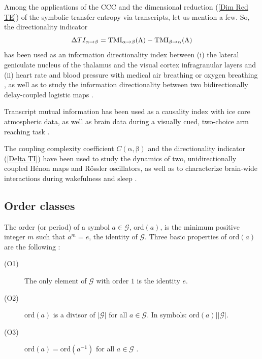 \documentclass[%
 aip,
 amsmath,amssymb,
 reprint,%
]{revtex4-1}
\begin{document}
Among the applications of the CCC and the dimensional reduction (\ref{Dim
Red TE}) of the symbolic transfer entropy via transcripts, let us mention a
few. So, the directionality indicator%
\begin{equation}
\Delta TI_{\mathrm{\alpha }\rightarrow \mathrm{\beta }}=\mathrm{TMI}_{%
\mathrm{\alpha }\rightarrow \mathrm{\beta }}(\Lambda )-\mathrm{TMI}_{\mathrm{%
\beta }\rightarrow \mathrm{\alpha }}(\Lambda )  \label{Delta TI}
\end{equation}%
has been used as an information directionality index between (i) the lateral
geniculate nucleus of the thalamus and the visual cortex infragranular
layers \cite{Amigo2015} and (ii) heart rate and blood pressure with medical
air breathing or oxygen breathing \cite{Amigo2016}, as well as to study the
information directionality between two bidirectionally delay-coupled
logistic maps \cite{Amigo2016}.

Transcript mutual information has been used as a causality index with ice core
atmospheric data, as well as brain data during a visually cued, two-choice
arm reaching task \cite{Hirata2016}.

The coupling complexity coefficient $C(\mathrm{\alpha },\mathrm{\beta })$
and the directionality indicator (\ref{Delta TI}) have been used to study
the dynamics of two, unidirectionally coupled H\'{e}non maps and R\"{o}ssler
oscillators, as well as to characterize brain-wide interactions during
wakefulness and sleep \cite{Adams2025B}.


\subsection{Order classes}

\label{sec53}

The order (or period) of a symbol $a\in \mathcal{G}$, \textrm{ord}$(a)$, is
the minimum positive integer $m$ such that $a^{m}=e$, the identity of $%
\mathcal{G}$. Three basic properties of \textrm{ord}$(a)$ are the following 
\cite{Herstein1996}:

\begin{description}
\item[(O1)] The only element of $\mathcal{G}$ with order $1$ is the identity 
$e$.

\item[(O2)] \textrm{ord}$(a)$ is a divisor of $\left\vert \mathcal{G}%
\right\vert $ for all $a\in \mathcal{G}$. In symbols: \textrm{ord}$%
(a)|\left\vert \mathcal{G}\right\vert $.

\item[(O3)] \textrm{ord}$(a)=\mathrm{ord}(a^{-1})$ for all $a\in \mathcal{G}$%
.
\end{description}
\end{document}
